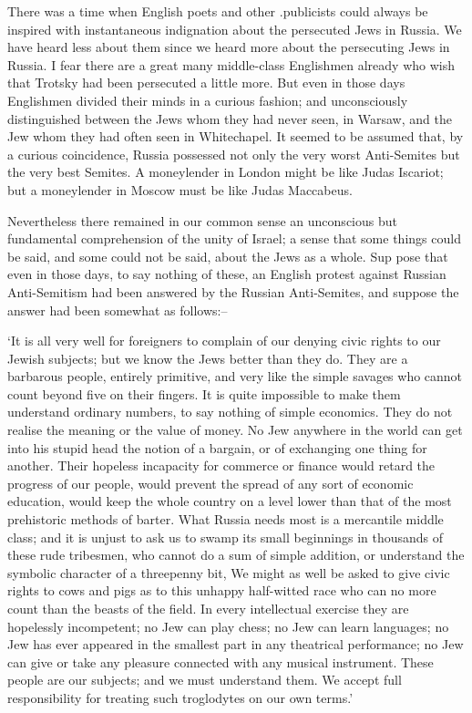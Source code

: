 \documentclass{book}
\begin{document}
There was a time when English poets and other .publicists could always be inspired with instantaneous indignation about the persecuted Jews in Russia. We have heard less about them since we heard more about the persecuting Jews in Russia. I fear there are a great many middle-class Englishmen already who wish that Trotsky had been persecuted a little more. But even in those days Englishmen divided their minds in a curious fashion; and unconsciously distinguished between the Jews whom they had never seen, in Warsaw, and the Jew whom they had often seen in Whitechapel. It seemed to be assumed that, by a curious coincidence, Russia possessed not only the very worst Anti-Semites but the very best Semites. A moneylender in London might be like Judas Iscariot; but a moneylender in Moscow must be like Judas Maccabeus.

Nevertheless there remained in our common sense an unconscious but fundamental comprehension of the unity of Israel; a sense that some things could be said, and some could not be said, about the Jews as a whole. Sup pose that even in those days, to say nothing of these, an English protest against Russian Anti-Semitism had been answered by the Russian Anti-Semites, and suppose the answer had been somewhat as follows:–

‘It is all very well for foreigners to complain of our denying civic rights to our Jewish subjects; but we know the Jews better than they do. They are a barbarous people, entirely primitive, and very like the simple savages who cannot count beyond five on their fingers. It is quite impossible to make them understand ordinary numbers, to say nothing of simple economics. They do not realise the meaning or the value of money. No Jew anywhere in the world can get into his stupid head the notion of a bargain, or of exchanging one thing for another. Their hopeless incapacity for commerce or finance would retard the progress of our people, would prevent the spread of any sort of economic education, would keep the whole country on a level lower than that of the most prehistoric methods of barter. What Russia needs most is a mercantile middle class; and it is unjust to ask us to swamp its small beginnings in thousands of these rude tribesmen, who cannot do a sum of simple addition, or understand the symbolic character of a threepenny bit, We might as well be asked to give civic rights to cows and pigs as to this unhappy half-witted race who can no more count than the beasts of the field. In every intellectual exercise they are hopelessly incompetent; no Jew can play chess; no Jew can learn languages; no Jew has ever appeared in the smallest part in any theatrical performance; no Jew can give or take any pleasure connected with any musical instrument. These people are our subjects; and we must understand them. We accept full responsibility for treating such troglodytes on our own terms.’
\end{document}
